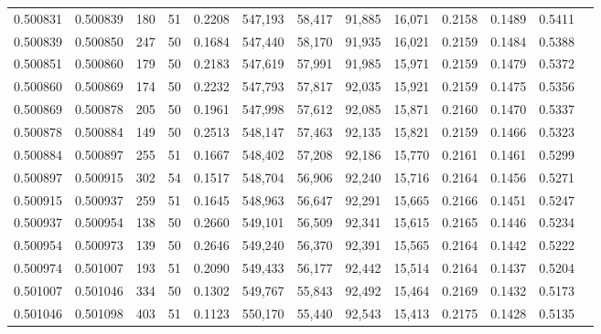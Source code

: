 \begin{tabular}{rrrrrrrrrrrrr}
0.500831 & 0.500839 & 180 &  51 &                                     0.2208 & 547,193 &  58,417 &  91,885 &  16,071 & 0.2158 & 0.1489 & 0.5411 \\
0.500839 & 0.500850 & 247 &  50 &                                     0.1684 & 547,440 &  58,170 &  91,935 &  16,021 & 0.2159 & 0.1484 & 0.5388 \\
0.500851 & 0.500860 & 179 &  50 &                                     0.2183 & 547,619 &  57,991 &  91,985 &  15,971 & 0.2159 & 0.1479 & 0.5372 \\
0.500860 & 0.500869 & 174 &  50 &                                     0.2232 & 547,793 &  57,817 &  92,035 &  15,921 & 0.2159 & 0.1475 & 0.5356 \\
0.500869 & 0.500878 & 205 &  50 &                                     0.1961 & 547,998 &  57,612 &  92,085 &  15,871 & 0.2160 & 0.1470 & 0.5337 \\
0.500878 & 0.500884 & 149 &  50 &                                     0.2513 & 548,147 &  57,463 &  92,135 &  15,821 & 0.2159 & 0.1466 & 0.5323 \\
0.500884 & 0.500897 & 255 &  51 &                                     0.1667 & 548,402 &  57,208 &  92,186 &  15,770 & 0.2161 & 0.1461 & 0.5299 \\
0.500897 & 0.500915 & 302 &  54 &                                     0.1517 & 548,704 &  56,906 &  92,240 &  15,716 & 0.2164 & 0.1456 & 0.5271 \\
0.500915 & 0.500937 & 259 &  51 &                                     0.1645 & 548,963 &  56,647 &  92,291 &  15,665 & 0.2166 & 0.1451 & 0.5247 \\
0.500937 & 0.500954 & 138 &  50 &                                     0.2660 & 549,101 &  56,509 &  92,341 &  15,615 & 0.2165 & 0.1446 & 0.5234 \\
0.500954 & 0.500973 & 139 &  50 &                                     0.2646 & 549,240 &  56,370 &  92,391 &  15,565 & 0.2164 & 0.1442 & 0.5222 \\
0.500974 & 0.501007 & 193 &  51 &                                     0.2090 & 549,433 &  56,177 &  92,442 &  15,514 & 0.2164 & 0.1437 & 0.5204 \\
0.501007 & 0.501046 & 334 &  50 &                                     0.1302 & 549,767 &  55,843 &  92,492 &  15,464 & 0.2169 & 0.1432 & 0.5173 \\
0.501046 & 0.501098 & 403 &  51 &                                     0.1123 & 550,170 &  55,440 &  92,543 &  15,413 & 0.2175 & 0.1428 & 0.5135 \\

\end{tabular}
